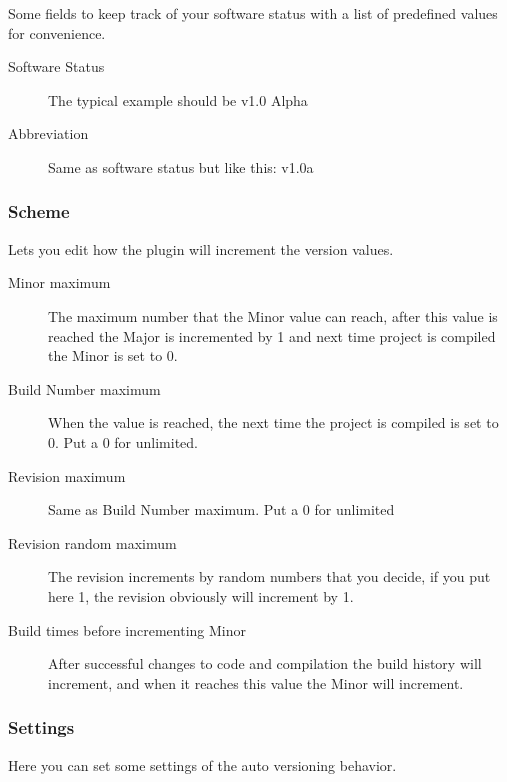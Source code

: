 Some fields to keep track of your software status with a list of predefined values for convenience.

\begin{description}
\item[Software Status] The typical example should be v1.0 Alpha
\item[Abbreviation] Same as software status but like this: v1.0a
\end{description}

\subsubsection{Scheme}

Lets you edit how the plugin will increment the version values.

\begin{description}
\item[Minor maximum] The maximum number that the Minor value can reach, after this value is reached the Major is incremented by 1 and next time project is compiled the Minor is set to 0.
\item[Build Number maximum] When the value is reached, the next time the project is compiled is set to 0. Put a 0 for unlimited.
\item[Revision maximum] Same as Build Number maximum. Put a 0 for unlimited
\item[Revision random maximum] The revision increments by random numbers that you decide, if you put here 1, the revision obviously will increment by 1.
\item[Build times before incrementing Minor] After successful changes to code and compilation the build history will increment, and when it reaches this value the Minor will increment.
\end{description}

\subsubsection{Settings}

Here you can set some settings of the auto versioning behavior.

